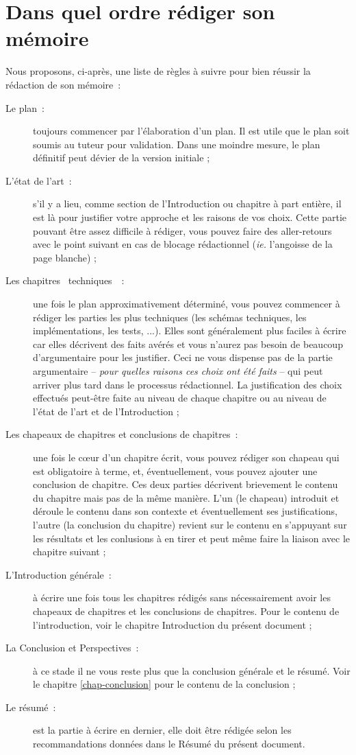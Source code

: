 \documentclass[a4paper, 12pt]{book}
\begin{document}
\section{Dans quel ordre rédiger son mémoire\label{sec-ordre-redaction}}
\noindent{}Nous proposons, ci-après, une liste de règles à suivre pour
bien réussir la rédaction de son mémoire~:
\begin{description}
\item[Le plan~:] toujours commencer par l'élaboration d'un plan. Il est
  utile que le plan soit soumis au tuteur pour validation. Dans une
  moindre mesure, le plan définitif peut dévier de la version initiale
  ;
\item[L'état de l'art~:] s'il y a lieu, comme section de
  l'Introduction ou chapitre à part entière, il est là pour justifier
  votre approche et les raisons de vos choix. Cette partie pouvant
  être assez difficile à rédiger, vous pouvez faire des aller-retours
  avec le point suivant en cas de blocage rédactionnel (\emph{ie.}
  l'angoisse de la page blanche) ;
\item[Les chapitres \guillemotleft{}~techniques~\guillemotright{}~:]
  une fois le plan approximativement déterminé, vous pouvez commencer
  à rédiger les parties les plus techniques (les schémas techniques,
  les implémentations, les tests, ...). Elles sont généralement plus
  faciles à écrire car elles décrivent des faits avérés et vous
  n'aurez pas besoin de beaucoup d'argumentaire pour les
  justifier. Ceci ne vous dispense pas de la partie argumentaire --
  \emph{pour quelles raisons ces choix ont été faits} -- qui peut
  arriver plus tard dans le processus rédactionnel. La justification
  des choix effectués peut-être faite au niveau de chaque chapitre ou
  au niveau de l'état de l'art et de l'Introduction ;
\item[Les chapeaux de chapitres et conclusions de chapitres~:] une
  fois le c\oe{}ur d'un chapitre écrit, vous pouvez rédiger son
  chapeau qui est obligatoire à terme, et, éventuellement, vous pouvez
  ajouter une conclusion de chapitre. Ces deux parties décrivent
  brievement le contenu du chapitre mais pas de la même manière. L'un
  (le chapeau) introduit et déroule le contenu dans son contexte et
  éventuellement ses justifications, l'autre (la conclusion du
  chapitre) revient sur le contenu en s'appuyant sur les résultats et
  les conlusions à en tirer et peut même faire la liaison avec le
  chapitre suivant ;
\item[L'Introduction générale~:] à écrire une fois tous les chapitres
  rédigés sans nécessairement avoir les chapeaux de chapitres et les
  conclusions de chapitres. Pour le contenu de l'introduction, voir le
  chapitre Introduction du présent document ;
\item[La Conclusion et Perspectives~:] à ce stade il ne vous reste
  plus que la conclusion générale et le résumé. Voir le chapitre
  \ref{chap-conclusion} pour le contenu de la conclusion ;
\item[Le résumé~:] est la partie à écrire en dernier, elle doit être
  rédigée selon les recommandations données dans le Résumé du présent
  document.
\end{description}
\end{document}
